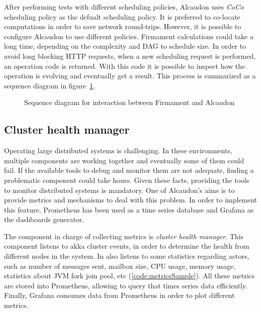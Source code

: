After performing tests with different scheduling policies, Alcaudon uses
\textit{CoCo} scheduling policy as the defualt scheduling policy. It is
preferred to co-locate computations in order to save network round-trips.
However, it is possible to configure Alcaudon to use different policies.
Firmament calculations could take a long time, depending on the complexity
and \acs{DAG} to schedule size. In order to avoid long blocking \acs{HTTP}
requests, when a new scheduling request is performed, an operation code
is returned. With this code it is possible to inspect how the operation is
evolving and eventually get a result. This process is summarized as a
sequence diagram in figure~\ref{fig:schedulefirmament}.

\begin{figure}[!h]
  \centering
  \scalebox{0.5}{
    
  }
\caption{Sequence diagram for interaction between Firmament and Alcaudon}
\label{fig:schedulefirmament}
\end{figure}


\subsection{Cluster health manager}

Operating large distributed systems is challenging. In these environments,
multiple components are working together and eventually some of them could fail.
If the available tools to debug and monitor them are not adequate, finding a
problematic component could take hours. Given these facts, providing the tools
to monitor distributed systems is mandatory. One of Alcaudon's aims is to
provide metrics and mechanisms to deal with this problem. In order to implement
this feature, Prometheus has been used as a time series database and Grafana
as the dashboards generator.

The component in charge of collecting metrics is \textit{cluster health
  manager}. This component listens to akka cluster events, in order to determine
the health from different nodes in the system. In also listens to some statistics
regarding actors, such as number of messages sent, mailbox size, CPU usage,
memory usage, statistics about \acs{JVM} fork join pool,
etc (\ref{code:metricsSample}). All these metrics are stored into Prometheus,
allowing to query that times series data efficiently. Finally, Grafana consumes
data from Prometheus in order to plot different metrics.


